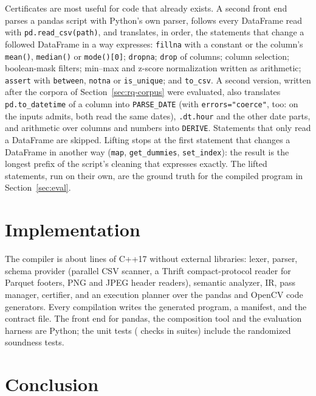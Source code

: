 Certificates are most useful for code that already exists. A second front end parses a pandas script
with Python's own parser, follows every DataFrame read with \texttt{pd.read\_csv(path)}, and
translates, in order, the statements that change a followed DataFrame in a way \PL expresses:
\texttt{fillna} with a constant or the column's \texttt{mean()}, \texttt{median()} or
\texttt{mode()[0]}; \texttt{dropna}; \texttt{drop} of columns; column selection; boolean-mask
filters; min--max and z-score normalization written as arithmetic; \texttt{assert} with
\texttt{between}, \texttt{notna} or \texttt{is\_unique}; and \texttt{to\_csv}. A second version,
written after the corpora of Section~\ref{sec:rq-corpus} were evaluated, also translates
\texttt{pd.to\_datetime} of a column into \texttt{PARSE\_DATE} (with \texttt{errors="coerce"}, too:
on the inputs \PL admits, both read the same dates), \texttt{.dt.hour} and the other date parts, and
arithmetic over columns and numbers into \texttt{DERIVE}. Statements that only read a DataFrame are
skipped. Lifting stops at the first statement that changes a DataFrame in another way (\texttt{map},
\texttt{get\_dummies}, \texttt{set\_index}): the result is the longest prefix of the script's cleaning
that \PL expresses exactly. The lifted statements, run on their own, are the ground truth for the
compiled program in Section~\ref{sec:eval}.

\section{Implementation}
The compiler is about \SrcLines{} lines of C++17 without external libraries: lexer, parser, schema
provider (parallel CSV scanner, a Thrift compact-protocol reader for Parquet footers, PNG and JPEG
header readers), semantic analyzer, IR, pass manager, certifier, and an execution planner over the
pandas and OpenCV code generators. Every compilation writes the generated program, a manifest, and the
contract file. The front end for pandas, the composition tool and the evaluation harness are Python;
the unit tests (\TestCount{} checks in \TestSuites{} suites) include the randomized soundness tests.





\section{Conclusion}

